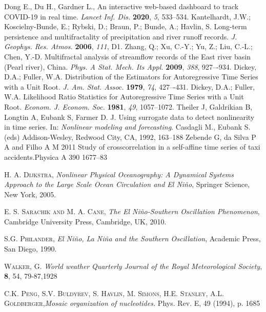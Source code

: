 \documentclass[onecolumn, preprint,aps,amsmath, amssymb, superscriptaddress]{revtex4}
\begin{document}
\begin{thebibliography}{99}
Dong E., Du H., Gardner L., An interactive web-based dashboard to track COVID-19 in real time. {\em Lancet Inf. Dis.} {\bf 2020}, {\em 5}, 533--534.
Kantelhardt, J.W.; Koscielny-Bunde, E.; Rybski, D.; Braun, P.; Bunde, A.; Havlin, S. Long-term persistence and multifractality of precipitation and river runoff records. {\em J. Geophys. Res. Atmos.} {\bf 2006}, {\em 111}, D1. 
Zhang, Q.; Xu, C.-Y.; Yu, Z.; Liu, C.-L.; Chen, Y.-D. Multifractal analysis of streamflow records of the East river basin (Pearl river), China. {\em Phys. A Stat. Mech. Its Appl.} {\bf 2009}, {\em 388}, 927–-934.
Dickey, D.A.; Fuller, W.A. Distribution of the Estimators for Autoregressive Time Series with a Unit Root. {\em J. Am. Stat. Assoc.} {\bf 1979}, {\em 74}, 427–-431.
Dickey, D.A.; Fuller, W.A. Likelihood Ratio Statistics for Autoregressive Time Series with a Unit Root. {\em Econom. J. Econom. Soc.} {\bf 1981}, {\em 49}, 1057–1072.
Theiler J, Galdrikian B, Longtin A, Eubank S, Farmer D. J. Using surrogate data to detect nonlinearity in time series. In: {\em Nonlinear modeling and forecasting}. Casdagli M., Eubank S.(eds) Addison-Wesley, Redwood City, CA, 1992, 163--188
Zebende G, da Silva P A and Filho A M 2011 Study of crosscorrelation
in a self-affine time series of taxi accidents.Physica A 390 1677–83

 \textsc{H. A. Dijkstra},
\textit{Nonlinear Physical Oceanography: A Dynamical
Systems Approach to the Large Scale Ocean Circulation and
El Ni\~no}, Springer Science, New York, 2005.

 \textsc{E. S. Sarachik and M. A. Cane},
\textit{The El Ni\~no-Southern Oscillation
Phenomenon}, Cambridge University Press, Cambridge, UK, 2010.

 \textsc{S.G. Philander},
\textit{El Ni\~no, La Ni\~na and the Southern Oscillation},
 Academic Press, San Diego, 1990.
 
 \textsc{Walker, G.}
\textit{World weather}
\textit{Quarterly Journal of the Royal Meteorological Society}, \textbf{8}, 54, 79-87,1928

 \textsc{C.K. Peng, S.V. Buldyrev, S. Havlin, M. Simons, H.E. Stanley, A.L. Goldberger},\textit{Mosaic organization of nucleotides.} Phys. Rev. E, 49 (1994), p. 1685


\end{thebibliography}
\end{document}
